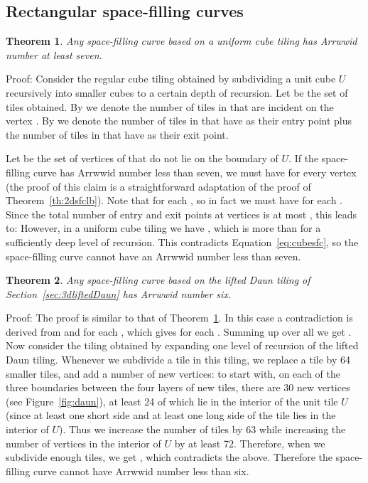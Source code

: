 \documentclass[11pt,a4paper]{article}
\newcommand{\unittile}{\ensuremath{U}\xspace}
\newtheorem{theorem}{Theorem}
\newenvironment{proof}{Proof:}{\qed}
\def\squareforqed{\hbox{\rlap{}}}
\def\qed{\ifmmode\squareforqed\else{\unskip\nobreak\hfil
\penalty50\hskip1em\null\nobreak\hfil\squareforqed
\parfillskip=0pt\finalhyphendemerits=0\endgraf}\fi}
\begin{document}
\subsection{Rectangular space-filling curves}

\begin{theorem}\label{th:cubesfc}
Any space-filling curve based on a uniform cube tiling has Arrwwid number at least seven.
\end{theorem}
\begin{proof}
Consider the regular cube tiling  obtained by subdividing a unit cube \unittile recursively into smaller cubes to a certain depth of recursion. Let  be the set of tiles obtained. By  we denote the number of tiles in  that are incident on the vertex . By  we denote the number of tiles in  that have  as their entry point plus the number of tiles in  that have  as their exit point.

Let  be the set of vertices of  that do not lie on the boundary of \unittile. If the space-filling curve has Arrwwid number less than seven, we must have  for every vertex  (the proof of this claim is a straightforward adaptation of the proof of Theorem~\ref{th:2dsfclb}). Note that  for each , so in fact we must have  for each . Since the total number of entry and exit points at vertices is at most , this leads to:
However, in a uniform cube tiling we have , which is more than  for a sufficiently deep level of recursion. This contradicts Equation~\ref{eq:cubesfc}, so the space-filling curve cannot have an Arrwwid number less than seven.
\end{proof}

\begin{theorem}
Any space-filling curve based on the lifted Daun tiling of Section~\ref{sec:3dliftedDaun} has Arrwwid number six.
\end{theorem}
\begin{proof}
The proof is similar to that of Theorem~\ref{th:cubesfc}. In this case a contradiction is derived from  and  for each , which gives  for each . Summing up over all  we get . Now consider the tiling obtained by expanding one level of recursion of the lifted Daun tiling. Whenever we subdivide a tile in this tiling, we replace a tile by 64 smaller tiles, and add a number of new vertices: to start with, on each of the three boundaries between the four layers of new tiles, there are 30 new vertices (see Figure~\ref{fig:daun}), at least 24 of which lie in the interior of the unit tile \unittile (since at least one short side and at least one long side of the tile lies in the interior of \unittile). Thus we increase the number of tiles by 63 while increasing the number of vertices in the interior of \unittile by at least 72. Therefore, when we subdivide enough tiles, we get , which contradicts the above. Therefore the space-filling curve cannot have Arrwwid number less than six.
\end{proof}
\end{document}
